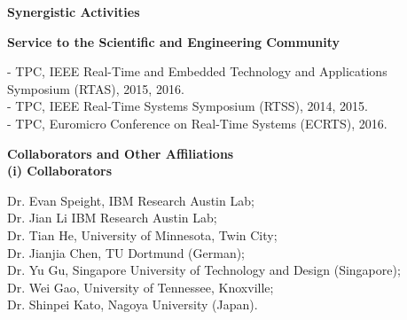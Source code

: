 \documentclass[10pt,letterpaper]{article}
\begin{document}
\newpage 

\noindent \textbf{Synergistic Activities}\
	\begin{changemargin}{4mm}{2mm}
	\textbf{Service to the Scientific and Engineering Community}\
	\vspace{-1mm}
		\begin{changemargin}{2mm}{2mm}	
		-  TPC, IEEE Real-Time and Embedded Technology and Applications Symposium (RTAS), 2015, 2016. \\
		 -   TPC, IEEE Real-Time Systems Symposium (RTSS), 2014, 2015. \\
			- TPC, Euromicro Conference on Real-Time Systems  (ECRTS), 2016.
			
			
		\end{changemargin}
	\end{changemargin}
	
	
\noindent \textbf{Collaborators and Other Affiliations}\\

\vspace{-2mm}
	\hspace{-2mm} \textbf{(i) Collaborators}\  
	\begin{changemargin}{8mm}{2mm}
	\vspace{-2mm}
	Dr. Evan Speight, IBM Research Austin Lab; \\
	Dr. Jian Li IBM Research Austin Lab;\\
	 Dr. Tian He, University of Minnesota, Twin City; \\
	  Dr. Jianjia Chen, TU Dortmund (German);\\
	   Dr. Yu Gu, Singapore University of Technology and Design (Singapore);\\
	    Dr. Wei Gao, University of Tennessee, Knoxville; \\
	    Dr. Shinpei Kato, Nagoya University (Japan).
	\end{changemargin}
	
\end{document}
